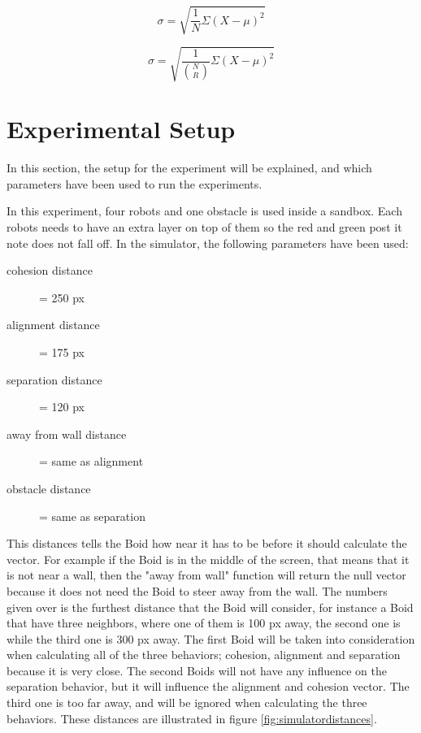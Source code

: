 \begin{equation}
\label{eq:sd}
\sigma =  \sqrt{\frac{1}{N}\Sigma(X-\mu)^2}
\end{equation}

\begin{equation}
\label{eq:sd2}
\sigma =  \sqrt{\frac{1}{{N \choose R}}\Sigma(X-\mu)^2}
\end{equation}


\section{Experimental Setup}
\label{sec:experimentalSetup}
In this section, the setup for the experiment will be explained, and which parameters have been used to run the experiments.

In this experiment, four robots and one obstacle is used inside a sandbox. Each robots needs to have an extra layer on top of them so the red and green post it note does not fall off.
In the simulator, the following parameters have been used:
\begin{description}
\item[cohesion distance] = 250 px
\item[alignment distance] = 175 px
\item[separation distance] = 120 px
\item[away from wall distance] = same as alignment
\item[obstacle distance] = same as separation
\end{description}
This distances tells the Boid how near it has to be before it should calculate the vector. For example if the Boid is in the middle of the screen, that means that it is not near a wall, then the "away from wall" function will return the null vector because it does not need the Boid to steer away from the wall.
The numbers given over is the furthest distance that the Boid will consider, for instance a Boid that have three neighbors, where one of them is 100 px away, the second one is  while the third one is 300 px away. The first Boid will be taken into consideration when calculating all of the three behaviors; cohesion, alignment and separation because it is very close. The second Boids will not have any influence on the separation behavior, but it will influence the alignment and cohesion vector. The third one is too far away, and will be ignored when calculating the three behaviors. These distances are illustrated in figure \ref{fig:simulatordistances}.

